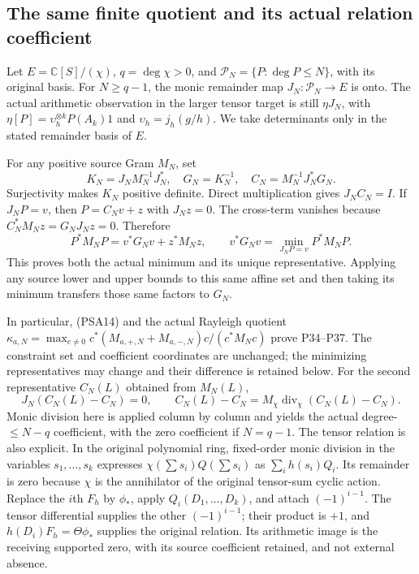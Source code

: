 \subsection{The same finite quotient and its actual relation coefficient}

Let $E=\mathbb C[S]/(\chi)$, $q=\deg\chi>0$, and
$\mathcal P_N=\{P:\deg P\le N\}$, with its original basis.
For $N\ge q-1$, the monic remainder map $J_N:\mathcal P_N\to E$
is onto. The actual arithmetic observation in the larger tensor target
is still $\eta J_N$, with
$\eta[P]=\upsilon_h^{\otimes k}P(A_k)1$ and
$\upsilon_h=j_h(g/h)$. We take determinants only in the stated
remainder basis of $E$.

For any positive source Gram $M_N$, set
\[
 K_N=J_NM_N^{-1}J_N^*,\quad G_N=K_N^{-1},\quad
 C_N=M_N^{-1}J_N^*G_N.
 \tag{PSA17}
\]
Surjectivity makes $K_N$ positive definite. Direct multiplication
gives $J_NC_N=I$. If $J_NP=v$, then $P=C_Nv+z$ with $J_Nz=0$.
The cross-term vanishes because
$C_N^*M_Nz=G_NJ_Nz=0$. Therefore
\[
 P^*M_NP=v^*G_Nv+z^*M_Nz,
 \qquad v^*G_Nv=\min_{J_NP=v}P^*M_NP.
 \tag{PSA18}
\]
This proves both the actual minimum and its unique representative.
Applying any source lower and upper bounds to this same affine set
and then taking its minimum transfers those same factors to $G_N$.

In particular, (PSA14) and the actual Rayleigh quotient
$\kappa_{a,N}=\max_{c\ne0}
c^*(M_{a,+,N}+M_{a,-,N})c/(c^*M_Nc)$ prove P34--P37.
The constraint set and coefficient coordinates are unchanged; the
minimizing representatives may change and their difference is retained
below. For the second representative
$C_N(L)$ obtained from $M_N(L)$,
\[
 J_N(C_N(L)-C_N)=0,\qquad
 C_N(L)-C_N=M_\chi\operatorname{div}_\chi(C_N(L)-C_N).
 \tag{PSA19}
\]
Monic division here is applied column by column and yields the actual
degree-$\le N-q$ coefficient, with the zero coefficient if $N=q-1$.
The tensor relation is also explicit. In the original polynomial
ring, fixed-order monic division in the variables $s_1,\ldots,s_k$
expresses $\chi(\sum s_i)Q(\sum s_i)$ as $\sum_i h(s_i)Q_i$.
Its remainder is zero because $\chi$ is the annihilator of the
original tensor-sum cyclic action. Replace the $i$th $F_h$ by
$\phi_*$, apply $Q_i(D_1,\ldots,D_k)$, and attach
$(-1)^{i-1}$. The tensor differential supplies the other
$(-1)^{i-1}$; their product is $+1$, and
$h(D_i)F_h=\Theta\phi_*$ supplies the original relation. Its
arithmetic image is the receiving supported zero, with its source
coefficient retained, and not external absence.

